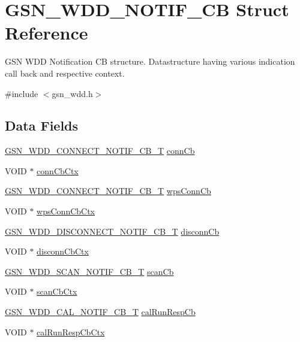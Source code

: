 \hypertarget{a00281}{
\section{GSN\_\-WDD\_\-NOTIF\_\-CB Struct Reference}
\label{a00281}
}


GSN WDD Notification CB structure. Datastructure having various indication call back and respective context.  




{\ttfamily \#include $<$gsn\_\-wdd.h$>$}

\subsection*{Data Fields}
\begin{DoxyCompactItemize}
\item 
\hyperlink{a00603_afa291ab10917d97cae6b9207522e623b}{GSN\_\-WDD\_\-CONNECT\_\-NOTIF\_\-CB\_\-T} \hyperlink{a00281_ac467196a531ed5b5891d047f599c899f}{connCb}
\item 
VOID $\ast$ \hyperlink{a00281_a18b517961e54813325f90a7cbba1c174}{connCbCtx}
\item 
\hyperlink{a00603_afa291ab10917d97cae6b9207522e623b}{GSN\_\-WDD\_\-CONNECT\_\-NOTIF\_\-CB\_\-T} \hyperlink{a00281_aac3de6f35860b82b824d429d408f246c}{wpsConnCb}
\item 
VOID $\ast$ \hyperlink{a00281_aa2c8d58d2156956a87b7a75c25a18bae}{wpsConnCbCtx}
\item 
\hyperlink{a00603_ac5fbb773daa449d33e065683260e253d}{GSN\_\-WDD\_\-DISCONNECT\_\-NOTIF\_\-CB\_\-T} \hyperlink{a00281_aacc4bc86e2332e539eafec82d0c45c24}{disconnCb}
\item 
VOID $\ast$ \hyperlink{a00281_a8d8fc7a1a7805470fbd3bbeb9493df94}{disconnCbCtx}
\item 
\hyperlink{a00603_a4929f46818bd2e51f1d25fecc36d30d6}{GSN\_\-WDD\_\-SCAN\_\-NOTIF\_\-CB\_\-T} \hyperlink{a00281_aa057e756ab3cf48ccebfd3c66f40a280}{scanCb}
\item 
VOID $\ast$ \hyperlink{a00281_ac9a86068d55c66bc14d984dc970da999}{scanCbCtx}
\item 
\hyperlink{a00603_a1dbcda6416e95d84f0c8f8f8dcad8a18}{GSN\_\-WDD\_\-CAL\_\-NOTIF\_\-CB\_\-T} \hyperlink{a00281_a80e4b422f7afe0e928eae23b721fe350}{calRunRespCb}
\item 
VOID $\ast$ \hyperlink{a00281_a51b4af5a179eabffbb8fa7f53ac7c0a3}{calRunRespCbCtx}
\end{DoxyCompactItemize}


